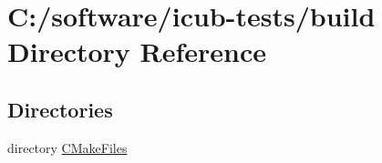 \section{C\+:/software/icub-\/tests/build Directory Reference}
\label{dir_4fef79e7177ba769987a8da36c892c5f}
\subsection*{Directories}
\begin{DoxyCompactItemize}
\item 
directory \hyperlink{dir_63772b626f2709090f0bdca0f40827b4}{C\+Make\+Files}
\end{DoxyCompactItemize}
